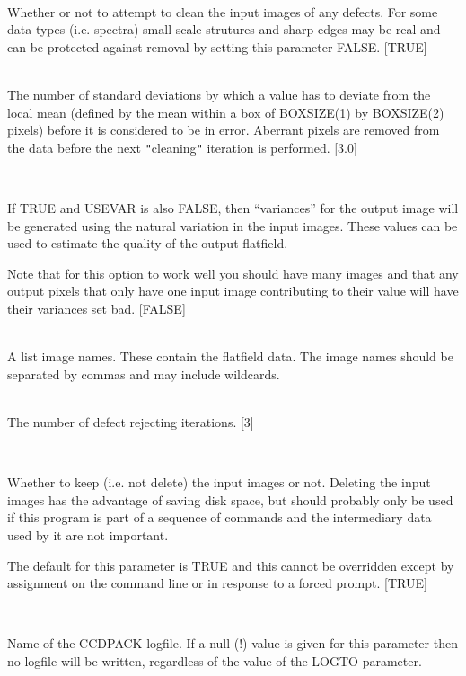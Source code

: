 \documentclass[twoside,11pt]{article}
\renewcommand{\_}{\texttt{\symbol{95}}}
\newcommand{\qt}[1]{{\tt "}#1{\tt "}}
\newcommand{\sstsubsection}[1]{ \item[{#1}] \mbox{} \\}
\newcommand{\sstsubsection}[1]{\item[{#1}]}
\begin{document}
{{      \sstsubsection{
         CLEAN = \_LOGICAL (Read)
      } {
         Whether or not to attempt to clean the input images of any
         defects. For some data types (i.e. spectra) small scale
         strutures and sharp edges may be real and can be protected
         against removal by setting this parameter FALSE.
         [TRUE]
      }
      \sstsubsection{
         GAMMA = \_REAL (Read)
      } {
         The number of standard deviations by which a value has to
         deviate from the local mean (defined by the mean within a box
         of BOXSIZE(1) by BOXSIZE(2) pixels) before it is considered to
         be in error. Aberrant pixels are removed from the data before
         the next \qt{cleaning} iteration is performed.
         [3.0]
      }

      \sstsubsection{
         GENVAR = \_LOGICAL (Read)
      } {
         If TRUE and USEVAR is also FALSE, then ``variances'' for the
         output image will be generated using the natural variation in
         the input images. These values can be used to estimate the
         quality of the output flatfield.

         Note that for this option to work well you should have many
         images and that any output pixels that only have one input
         image contributing to their value will have their variances 
         set bad.
         [FALSE]
      }

      \sstsubsection{
         IN = LITERAL (Read)
      } {
         A list image names. These contain the flatfield data.  The image
         names should be separated by commas and may include wildcards.
      }
      \sstsubsection{
         ITER = \_INTEGER (Read)
      } {
         The number of defect rejecting iterations.
         [3]
      }
      \sstsubsection{
         KEEPIN = \_LOGICAL (Read)
      } {
         Whether to keep (i.e. not delete) the input images or
         not. Deleting the input images has the advantage of saving disk
         space, but should probably only be used if this program is part
         of a sequence of commands and the intermediary data used by
         it are not important.

         The default for this parameter is TRUE and this cannot be
         overridden except by assignment on the command line or in
         response to a forced prompt.
         [TRUE]
      }
      \sstsubsection{
         LOGFILE = FILENAME (Read)
      } {
         Name of the CCDPACK logfile.  If a null (!) value is given for
         this parameter then no logfile will be written, regardless of
         the value of the LOGTO parameter.

}}}
\end{document}
